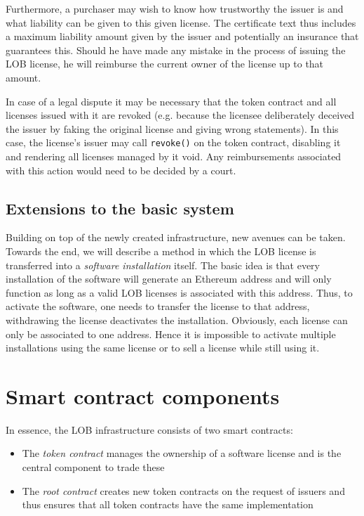 \documentclass[a4paper]{article}
\begin{document}
Furthermore, a purchaser may wish to know how trustworthy the issuer is and what liability can be given to this given license. The certificate text thus includes a maximum liability amount given by the issuer and potentially an insurance that guarantees this. Should he have made any mistake in the process of issuing the LOB license, he will reimburse the current owner of the license up to that amount.

In case of a legal dispute it may be necessary that the token contract and all licenses issued with it are revoked (e.g. because the licensee deliberately deceived the issuer by faking the original license and giving wrong statements). In this case, the license's issuer may call \texttt{revoke()} on the token contract, disabling it and rendering all licenses managed by it void. Any reimbursements associated with this action would need to be decided by a court.

\subsection{Extensions to the basic system}

Building on top of the newly created infrastructure, new avenues can be taken. Towards the end, we will describe a method in which the LOB license is transferred into a \emph{software installation} itself. The basic idea is that every installation of the software will generate an Ethereum address and will only function as long as a valid LOB licenses is associated with this address. Thus, to activate the software, one needs to transfer the license to that address, withdrawing the license deactivates the installation. Obviously, each license can only be associated to one address. Hence it is impossible to activate multiple installations using the same license or to sell a license while still using it.

\section{Smart contract components}

In essence, the LOB infrastructure consists of two smart contracts: 
\begin{itemize}
  \item The \emph{token contract} manages the ownership of a software license and is the central component to trade these
  \item The \emph{root contract} creates new token contracts on the request of issuers and thus ensures that all token contracts have the same implementation
\end{itemize}
\end{document}
